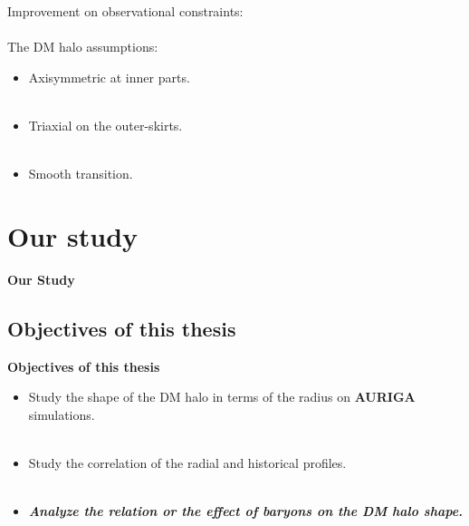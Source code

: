 \documentclass[xcolor=dvipsnames]{beamer}
\begin{document}
\begin{frame}

Improvement on observational constraints: \cite[Vera-Ciro and Helmi 2013]{Vera-Ciro2013}\\~\\

The DM halo assumptions:

\begin{itemize}
\item Axisymmetric at inner parts.\\~\\

\item Triaxial on the outer-skirts.\\~\\

\item Smooth transition.

\end{itemize}

\end{frame}

\section{Our study}
\begin{frame}
\centering
\Huge
\textbf{Our Study}
\normalsize
\end{frame}

\subsection{Objectives of this thesis}
\begin{frame}
\centering
\LARGE
\textbf{Objectives of this thesis}
\normalsize
\end{frame}

\begin{frame}

\begin{itemize}
\item Study the shape of the DM halo in terms of the radius on \textbf{AURIGA} simulations.\\~\\

\item Study the correlation of the radial and historical profiles.\\~\\

\item \textbf{\textit{Analyze the relation or the effect of baryons on the DM halo shape.}}

\end{itemize}

\end{frame}
\end{document}
